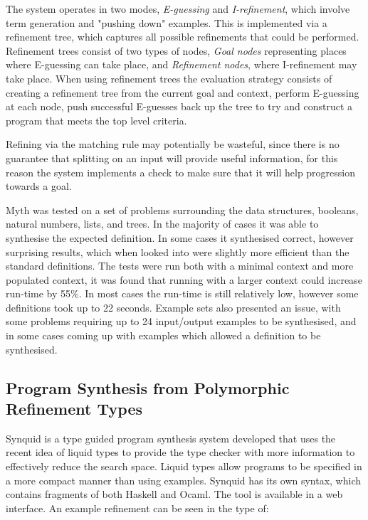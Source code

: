 \documentclass[a4paper]{article}
\begin{document}
The system operates in two modes, \emph{E-guessing} and \emph{I-refinement}, which involve term generation and "pushing down" examples. This is implemented via a 
refinement tree, which captures all possible refinements that could be performed. Refinement trees consist of two types of nodes, \emph{Goal nodes} representing 
places where E-guessing can take place, and \emph{Refinement nodes}, where I-refinement may take place. When using refinement 
trees the evaluation strategy consists of creating a refinement tree from the current goal and context, perform E-guessing at 
each node, push successful E-guesses back up the tree to try and construct a program that meets the top level criteria. 

Refining via the matching rule may potentially be wasteful, since there is no guarantee that splitting on an input will
provide useful information, for this reason the system implements a check to make sure that 
it will help progression towards a goal. 

Myth was tested on a set of problems surrounding the data structures, booleans, natural numbers, lists, and trees. In the majority of 
cases it was able to synthesise the expected definition. In some cases it synthesised correct, however surprising results, which 
when looked into were slightly more efficient than the standard definitions. The tests were run both with a minimal context and 
more populated context, it was found that running with a larger context could increase run-time by 55\%. In most cases the run-time 
is still relatively low, however some definitions took up to 22 seconds. Example sets also presented an issue, with some 
problems requiring up to 24 input/output examples to be synthesised, and in some cases coming up with examples which allowed a definition to be synthesised. 

\subsection{Program Synthesis from Polymorphic Refinement Types}
\label{sec:org9b52768}
Synquid is a type guided program synthesis system developed that uses the recent idea of liquid types to provide the 
type checker with more information to effectively reduce the search space.
Liquid types allow programs to be specified in a more compact manner than using examples. Synquid has
its own syntax, which contains fragments of both Haskell and Ocaml. The tool is available in a web interface. An example refinement can be seen in the type of:
\end{document}
